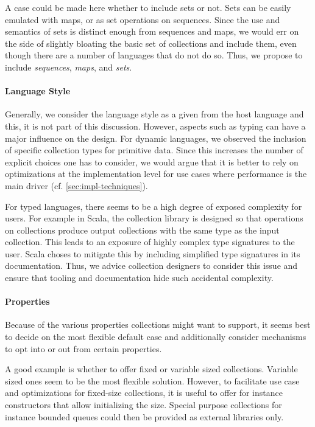 \documentclass[sigconf, 10pt]{acmart}
\begin{document}
A case could be made here whether to include sets or not.
Sets can be easily emulated with maps, or as set operations on sequences.
Since the use and semantics of sets is distinct enough from sequences and maps,
we would err on the side of slightly bloating the basic set of collections
and include them, even though there are a number of languages that do not do so.
Thus, we propose to include \emph{sequences}, \emph{maps}, and \emph{sets}.

\paragraph{Language Style}

Generally, we consider the language style as a given from the host language
and this, it is not part of this discussion.
However, aspects such as typing can have a major influence on the design.
For dynamic languages,
we observed the inclusion of specific collection types for primitive data.
Since this increases the number of explicit choices one has to consider,
we would argue that it is better to rely on optimizations
at the implementation level for use cases
where performance is the main driver (cf. \cref{sec:impl-techniques}).

For typed languages, there seems to be a high degree of exposed complexity
for users.
For example in Scala, the collection library is designed
so that operations on collections produce output collections
with the same type as the input collection\citep{Odersky:2009}.
This leads to an exposure of highly complex type signatures to the user.
Scala choses to mitigate this by including simplified type signatures
in its documentation.
Thus, we advice collection designers to consider this issue
and ensure that tooling and documentation hide such accidental complexity.


\paragraph{Properties}

Because of the various properties collections might want to support,
it seems best to decide on the most flexible default case
and additionally consider mechanisms to opt into or out from certain properties.

A good example is whether to offer fixed or variable sized collections.
Variable sized ones seem to be the most flexible solution.
However, to facilitate use case and optimizations for fixed-size collections,
it is useful to offer for instance constructors
that allow initializing the size.
Special purpose collections for instance bounded queues could then be provided
as external libraries only.
\end{document}
